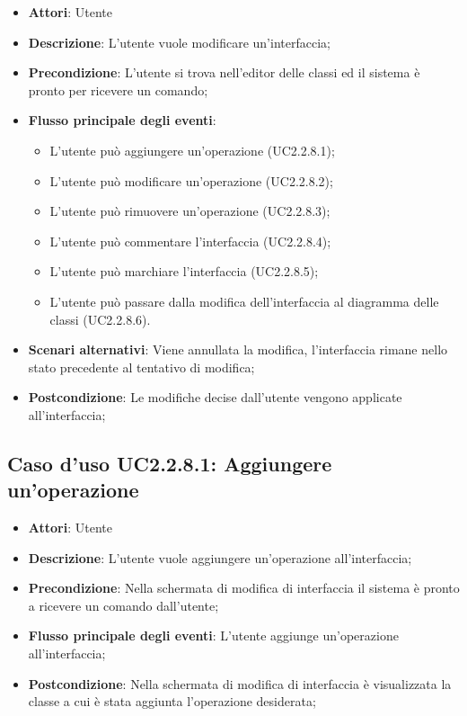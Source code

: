 \documentclass[../AnalisiDeiRequisiti.tex]{subfiles}
\begin{document}
			\begin{itemize}
				\item \textbf{Attori}: Utente
				\item \textbf{Descrizione}: L'utente vuole modificare un'interfaccia;
				\item \textbf{Precondizione}: L'utente si trova nell'editor delle classi ed il sistema è pronto per ricevere un comando;
				\item \textbf{Flusso principale degli eventi}: \begin{itemize}
					\item L'utente può aggiungere un'operazione (UC2.2.8.1);
					\item L'utente può modificare un'operazione (UC2.2.8.2);
					\item L'utente può rimuovere un'operazione (UC2.2.8.3);
					\item L'utente può commentare l'interfaccia (UC2.2.8.4);
					\item L'utente può marchiare l'interfaccia (UC2.2.8.5);
					\item L'utente può passare dalla modifica dell'interfaccia al diagramma delle classi (UC2.2.8.6).
				\end{itemize}
				\item \textbf{Scenari alternativi}: Viene annullata la modifica, l'interfaccia rimane nello stato precedente al tentativo di modifica;
				\item \textbf{Postcondizione}: Le modifiche decise dall'utente vengono applicate all'interfaccia;
			\end{itemize}
			\subsection{Caso d'uso UC2.2.8.1: Aggiungere un'operazione}
			\begin{itemize}
				\item \textbf{Attori}: Utente
				\item \textbf{Descrizione}: L'utente vuole aggiungere un'operazione all'interfaccia;
				\item \textbf{Precondizione}: Nella schermata di modifica di interfaccia il sistema è pronto a ricevere un comando dall'utente;
				\item \textbf{Flusso principale degli eventi}: L'utente aggiunge un'operazione all'interfaccia;
				\item \textbf{Postcondizione}: Nella schermata di modifica di interfaccia è visualizzata la classe a cui è stata aggiunta l'operazione desiderata;
			\end{itemize}
\end{document}
